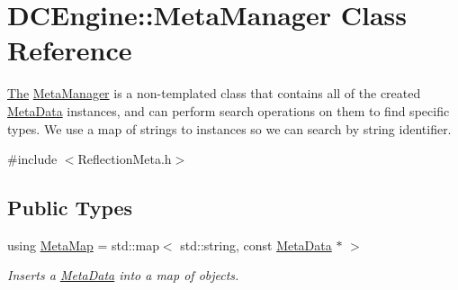 \hypertarget{classDCEngine_1_1MetaManager}{\section{D\-C\-Engine\-:\-:Meta\-Manager Class Reference}
\label{classDCEngine_1_1MetaManager}
}


\hyperlink{classThe}{The} \hyperlink{classDCEngine_1_1MetaManager}{Meta\-Manager} is a non-\/templated class that contains all of the created \hyperlink{classDCEngine_1_1MetaData}{Meta\-Data} instances, and can perform search operations on them to find specific types. We use a map of strings to instances so we can search by string identifier.  




{\ttfamily \#include $<$Reflection\-Meta.\-h$>$}

\subsection*{Public Types}
\begin{DoxyCompactItemize}
\item 
\hypertarget{classDCEngine_1_1MetaManager_a562b47d9f1618a39fdb9130688823dbd}{using \hyperlink{classDCEngine_1_1MetaManager_a562b47d9f1618a39fdb9130688823dbd}{Meta\-Map} = std\-::map$<$ std\-::string, const \hyperlink{classDCEngine_1_1MetaData}{Meta\-Data} $\ast$ $>$}\label{classDCEngine_1_1MetaManager_a562b47d9f1618a39fdb9130688823dbd}

\begin{DoxyCompactList}\small\item\em Inserts a \hyperlink{classDCEngine_1_1MetaData}{Meta\-Data} into a map of objects. \end{DoxyCompactList}\end{DoxyCompactItemize}
